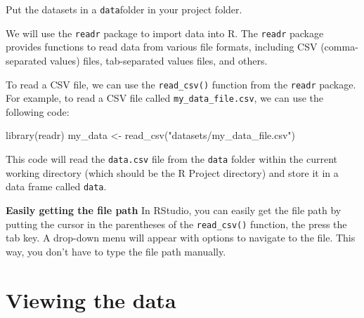 \documentclass[
  letterpaper,
  8pt,
  a4paper]{book}
\newenvironment{Shaded}{\begin{snugshade}}{\end{snugshade}}
\newcommand{\FunctionTok}[1]{\textcolor[rgb]{0.28,0.35,0.67}{#1}}
\newcommand{\NormalTok}[1]{\textcolor[rgb]{0.00,0.23,0.31}{#1}}
\newcommand{\OtherTok}[1]{\textcolor[rgb]{0.00,0.23,0.31}{#1}}
\newcommand{\StringTok}[1]{\textcolor[rgb]{0.13,0.47,0.30}{#1}}
\begin{document}
Put the datasets in a \texttt{data}folder in your project folder.

We will use the \texttt{readr} package to import data into R. The
\texttt{readr} package provides functions to read data from various file
formats, including CSV (comma-separated values) files, tab-separated
values files, and others.

To read a CSV file, we can use the \texttt{read\_csv()} function from
the \texttt{readr} package. For example, to read a CSV file called
\texttt{my\_data\_file.csv}, we can use the following code:

\begin{Shaded}
\begin{Highlighting}[]
\FunctionTok{library}\NormalTok{(readr)}
\NormalTok{my\_data }\OtherTok{\textless{}{-}} \FunctionTok{read\_csv}\NormalTok{(}\StringTok{"datasets/my\_data\_file.csv"}\NormalTok{)}
\end{Highlighting}
\end{Shaded}

This code will read the \texttt{data.csv} file from the \texttt{data}
folder within the current working directory (which should be the R
Project directory) and store it in a data frame called \texttt{data}.

\begin{tcolorbox}[enhanced jigsaw, arc=.35mm, bottomrule=.15mm, bottomtitle=1mm, breakable, colback=white, colbacktitle=quarto-callout-tip-color!10!white, colframe=quarto-callout-tip-color-frame, coltitle=black, left=2mm, leftrule=.75mm, opacityback=0, opacitybacktitle=0.6, rightrule=.15mm, title=\textcolor{quarto-callout-tip-color}{\faLightbulb}\hspace{0.5em}{Tip}, titlerule=0mm, toprule=.15mm, toptitle=1mm]

\textbf{Easily getting the file path} In RStudio, you can easily get the
file path by putting the cursor in the parentheses of the
\texttt{read\_csv()} function, the press the tab key. A drop-down menu
will appear with options to navigate to the file. This way, you don't
have to type the file path manually.

\end{tcolorbox}

\section*{Viewing the data}\label{viewing-the-data}
\end{document}

